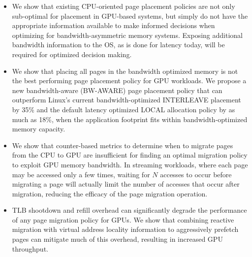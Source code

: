 \begin{itemize}
\item
We show that existing CPU-oriented page placement policies are not only 
sub-optimal for placement in GPU-based systems, but simply do not have the 
appropriate information available to make informed decisions when optimizing for 
bandwidth-asymmetric memory systems. Exposing additional bandwidth information 
to the OS, as is done for latency today, will be required for optimized decision 
making.

\item
We show that placing all pages in the bandwidth optimized memory is not the best
performing page placement policy for GPU workloads.  We propose a new
bandwidth-aware (BW-AWARE) page placement policy that can outperform Linux's
current bandwidth-optimized INTERLEAVE placement by 35\% and the default latency
optimized LOCAL allocation policy by as much as 18\%, when the application
footprint fits within bandwidth-optimized memory capacity.  


\item
We show that counter-based metrics to determine when to migrate pages from the
CPU to GPU are insufficient for finding an optimal migration policy to exploit
GPU memory bandwidth.  In streaming workloads, where each page may be accessed
only a few times, waiting for $N$ accesses to occur before migrating a page will
actually limit the number of accesses that occur after migration, reducing the
efficacy of the page migration operation.

\item
TLB shootdown and refill overhead can significantly degrade the performance of
any page migration policy for GPUs\@. We show that combining reactive migration
with virtual address locality information to aggressively prefetch pages can
mitigate much of this overhead, resulting in increased GPU throughput.


\end{itemize}
